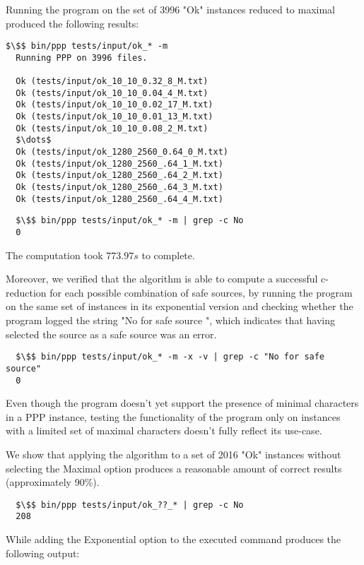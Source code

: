 Running the program on the set of 3996 "Ok" instances reduced to maximal produced the following results:

\lstset{style=code_block}

\begin{lstlisting}[belowskip=0pt]
  $\$$ bin/ppp tests/input/ok_* -m
  Running PPP on 3996 files.

  Ok (tests/input/ok_10_10_0.32_8_M.txt)
  Ok (tests/input/ok_10_10_0.04_4_M.txt)
  Ok (tests/input/ok_10_10_0.02_17_M.txt)
  Ok (tests/input/ok_10_10_0.01_13_M.txt)
  Ok (tests/input/ok_10_10_0.08_2_M.txt)
  $\dots$
  Ok (tests/input/ok_1280_2560_0.64_0_M.txt)
  Ok (tests/input/ok_1280_2560_.64_1_M.txt)
  Ok (tests/input/ok_1280_2560_.64_2_M.txt)
  Ok (tests/input/ok_1280_2560_.64_3_M.txt)
  Ok (tests/input/ok_1280_2560_.64_4_M.txt)
\end{lstlisting}

\begin{lstlisting}
  $\$$ bin/ppp tests/input/ok_* -m | grep -c No
  0
\end{lstlisting}

The computation took $773.97s$ to complete.

Moreover, we verified that the algorithm is able to compute a successful c-reduction for each possible combination of safe sources, by running the program on the same set of instances in its exponential version and checking whether the program logged the string "No for safe source \species{}", which indicates that having selected the source \species{} as a safe source was an error.

\begin{lstlisting}
  $\$$ bin/ppp tests/input/ok_* -m -x -v | grep -c "No for safe source"
  0
\end{lstlisting}

Even though the program doesn't yet support the presence of minimal characters in a PPP instance, testing the functionality of the program only on instances with a limited set of maximal characters doesn't fully reflect its use-case.

We show that applying the algorithm to a set of 2016 "Ok" instances without selecting the Maximal option produces a reasonable amount of correct results (approximately 90\%).

\begin{lstlisting}
  $\$$ bin/ppp tests/input/ok_??_* | grep -c No
  208
\end{lstlisting}

While adding the Exponential option to the executed command produces the following output:

